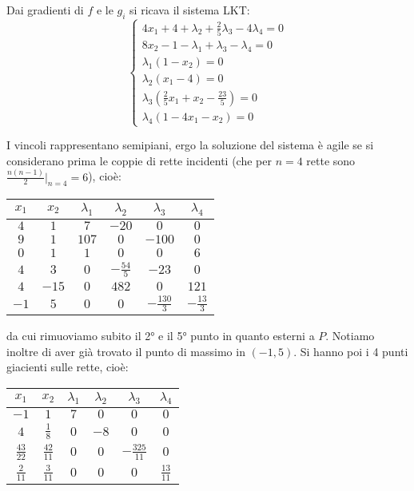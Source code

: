 \documentclass[a4paper,11pt]{article}
\begin{document}
\begin{itemize}
\begin{enumerate}
		Dai gradienti di $f$ e le $g_i$ si ricava il sistema LKT:
		\[
			\begin{cases}			
				4 x_1 + 4 + \lambda_2 + \frac{2}{5} \lambda_3 - 4 \lambda_4 = 0 \\ 
				8 x_2 - 1 - \lambda_1 + \lambda_3 - \lambda_4 = 0 \\ 
				\lambda_1 (1 - x_2) = 0 \\ 
				\lambda_2 (x_1 - 4) = 0 \\ 
				\lambda_3 (\frac{2}{5}x_1 + x_2 - \frac{23}{5}) = 0 \\ 
				\lambda_4 (1 - 4 x_1 - x_2) = 0
			\end{cases}
		\]
		\end{enumerate}
		I vincoli rappresentano semipiani, ergo la soluzione del sistema è agile se si considerano prima le coppie di rette incidenti (che per $n=4$ rette sono $\frac{n(n-1)}{2} \big|_{n=4} = 6$), cioè:
	\begin{table}[H]
		\center 
		\begin{tabular} { c c | c c c c }
			$x_1$ & $x_2$ & $\lambda_1$ & $\lambda_2$ & $\lambda_3$ & $\lambda_4$ \\ 
			\hline 
			$4$ & $1$ & $7$ & $-20$ & $0$ & $0$ \\ 
			$9$ & $1$ & $107$ & $0$ & $-100$ & $0$ \\ 
			$0$ & $1$ & $1$ & $0$ & $0$ & $6$ \\ 
			$4$ & $3$ & $0$ & $-\frac{54}{5}$ & $-23$ & $0$ \\ 
			$4$ & $-15$ & $0$ & $482$ & $0$ & $121$ \\ 
			$-1$ & $5$ & $0$ & $0$ & $-\frac{130}{3}$ & $-\frac{13}{3}$
		\end{tabular}
	\end{table}
	da cui rimuoviamo subito il 2° e il 5° punto in quanto esterni a $P$.
	Notiamo inoltre di aver già trovato il punto di massimo in $(-1, 5)$.
	Si hanno poi i 4 punti giacienti sulle rette, cioè:
	\begin{table}[H]
		\center 
		\begin{tabular} { c c | c c c c }
			$x_1$ & $x_2$ & $\lambda_1$ & $\lambda_2$ & $\lambda_3$ & $\lambda_4$ \\ 
			\hline 
			$-1$ & $1$ & $7$ & $0$ & $0$ & $0$ \\ 
			$4$ & $\frac{1}{8}$ & $0$ & $-8$ & $0$ & $0$ \\ 
			$\frac{43}{22}$ & $\frac{42}{11}$ & $0$ & $0$ & $-\frac{325}{11}$ & $0$ \\ 
			$\frac{2}{11}$ & $\frac{3}{11}$ & $0$ & $0$ & $0$ & $\frac{13}{11}$

\end{tabular}
\end{table}
\end{itemize}
\end{document}
